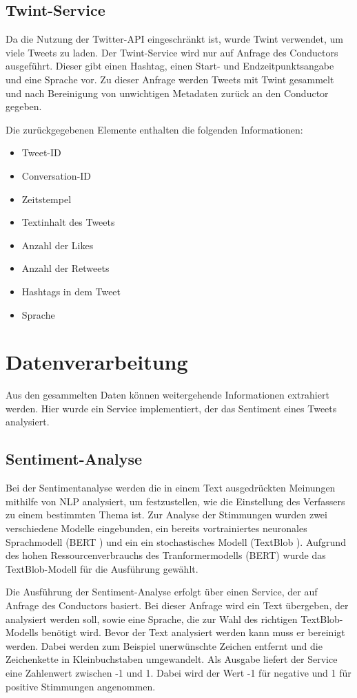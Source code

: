 \documentclass[conference]{IEEEtran}
\begin{document}
\subsection*{Twint-Service}
Da die Nutzung der Twitter-API eingeschränkt ist, wurde Twint verwendet, um viele Tweets zu laden.
Der Twint-Service wird nur auf Anfrage des Conductors ausgeführt.
Dieser gibt einen Hashtag, einen Start- und Endzeitpunktsangabe und eine Sprache vor.
Zu dieser Anfrage werden Tweets mit Twint gesammelt und nach Bereinigung von unwichtigen Metadaten zurück an den Conductor gegeben.

Die zurückgegebenen Elemente enthalten die folgenden Informationen:
\begin{itemize}
    \item Tweet-ID
    \item Conversation-ID
    \item Zeitstempel
    \item Textinhalt des Tweets
    \item Anzahl der Likes
    \item Anzahl der Retweets
    \item Hashtags in dem Tweet
    \item Sprache
\end{itemize}

\section{Datenverarbeitung}
Aus den gesammelten Daten können weitergehende Informationen extrahiert werden.
Hier wurde ein Service implementiert, der das Sentiment eines Tweets analysiert.

\subsection*{Sentiment-Analyse}
Bei der Sentimentanalyse werden die in einem Text ausgedrückten Meinungen mithilfe von NLP analysiert,
um festzustellen, wie die Einstellung des Verfassers zu einem bestimmten Thema ist.
Zur Analyse der Stimmungen wurden zwei verschiedene Modelle eingebunden,
ein bereits vortrainiertes neuronales Sprachmodell (BERT \cite{bert})
und ein ein stochastisches Modell (TextBlob \cite{textblob}).
Aufgrund des hohen Ressourcenverbrauchs des Tranformermodells (BERT) wurde das TextBlob-Modell für die Ausführung gewählt.

Die Ausführung der Sentiment-Analyse erfolgt über einen Service, der auf Anfrage des Conductors basiert.
Bei dieser Anfrage wird ein Text übergeben, der analysiert werden soll,
sowie eine Sprache, die zur Wahl des richtigen TextBlob-Modells benötigt wird.
Bevor der Text analysiert werden kann muss er bereinigt werden.
Dabei werden zum Beispiel unerwünschte Zeichen entfernt und die Zeichenkette in Kleinbuchstaben umgewandelt.
Als Ausgabe liefert der Service eine Zahlenwert zwischen -1 und 1.
Dabei wird der Wert -1 für negative und 1 für positive Stimmungen angenommen.
\end{document}
